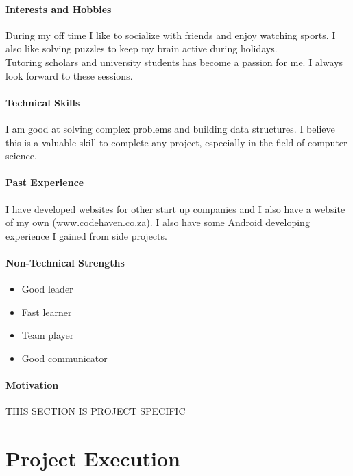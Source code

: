 \documentclass[english]{article}
\begin{document}
			\paragraph{Interests and Hobbies}
			During my off time I like to socialize with friends and enjoy watching sports. I also like solving puzzles to keep my brain active during holidays.\\
			Tutoring scholars and university students has become a passion for me. I always look forward to these sessions.
			
			\paragraph{Technical Skills}
			I am good at solving complex problems and building data structures. I believe this is a valuable skill to complete any project, especially in the field of computer science.
			
			\paragraph{Past Experience}
			I have developed websites for other start up companies and I also have a website of my own (\href{http://www.codehaven.co.za}{www.codehaven.co.za}).
			I also have some Android developing experience I gained from side projects.
			
			\paragraph{Non-Technical Strengths}
			\begin{itemize}
				\setlength\itemsep{0.2em}
				\item Good leader
				\item Fast learner
				\item Team player
				\item Good communicator
			\end{itemize}
			
			\paragraph{Motivation}
			THIS SECTION IS PROJECT SPECIFIC
			
	\newpage
	\section{Project Execution}
\end{document}
